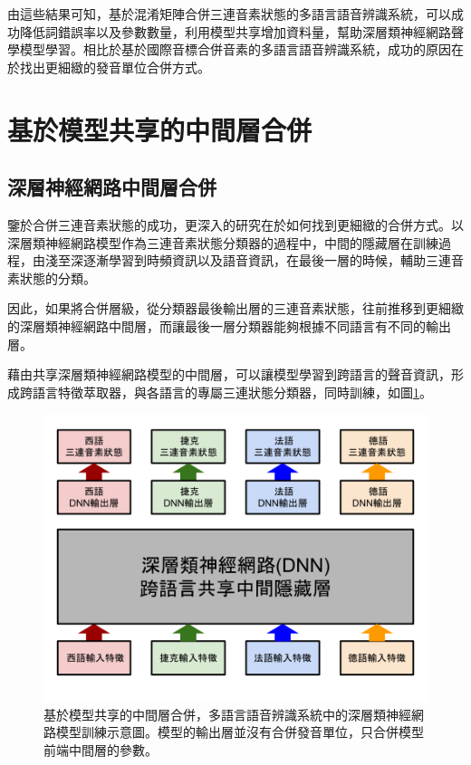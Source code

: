 由這些結果可知，基於混淆矩陣合併三連音素狀態的多語言語音辨識系統，可以成功降低詞錯誤率以及參數數量，利用模型共享增加資料量，幫助深層類神經網路聲學模型學習。相比於基於國際音標合併音素的多語言語音辨識系統，成功的原因在於找出更細緻的發音單位合併方式。

\section{基於模型共享的中間層合併}
\subsection{深層神經網路中間層合併}
鑒於合併三連音素狀態的成功，更深入的研究在於如何找到更細緻的合併方式。以深層類神經網路模型作為三連音素狀態分類器的過程中，中間的隱藏層在訓練過程，由淺至深逐漸學習到時頻資訊以及語音資訊，在最後一層的時候，輔助三連音素狀態的分類。

因此，如果將合併層級，從分類器最後輸出層的三連音素狀態，往前推移到更細緻的深層類神經網路中間層，而讓最後一層分類器能夠根據不同語言有不同的輸出層。

藉由共享深層類神經網路模型的中間層，可以讓模型學習到跨語言的聲音資訊，形成跨語言特徵萃取器，與各語言的專屬三連狀態分類器，同時訓練，如圖\ref{fig:chap4_dnn_sharing}。
\begin{figure}[!h]
\centering
\includegraphics[scale=0.4]{images/chap4_dnn_sharing.png}
\caption{基於模型共享的中間層合併，多語言語音辨識系統中的深層類神經網路模型訓練示意圖。模型的輸出層並沒有合併發音單位，只合併模型前端中間層的參數。}
\label{fig:chap4_dnn_sharing}
\end{figure}


